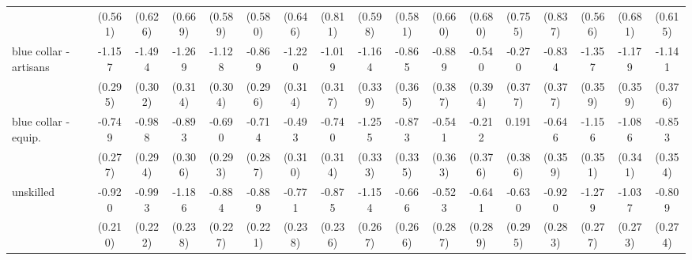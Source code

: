 {\begin{tabular}{l*{16}{c}}
                    &     (0.561)         &     (0.626)         &     (0.669)         &     (0.589)         &     (0.580)         &     (0.646)         &     (0.811)         &     (0.598)         &     (0.581)         &     (0.660)         &     (0.680)         &     (0.755)         &     (0.837)         &     (0.566)         &     (0.681)         &     (0.615)         \\
[1em]
blue collar - artisans&      -1.157\sym{***}&      -1.494\sym{***}&      -1.269\sym{***}&      -1.128\sym{***}&      -0.869\sym{**} &      -1.220\sym{***}&      -1.019\sym{**} &      -1.164\sym{***}&      -0.865\sym{*}  &      -0.889\sym{*}  &      -0.540         &      -0.270         &      -0.834\sym{*}  &      -1.357\sym{***}&      -1.179\sym{**} &      -1.141\sym{**} \\
                    &     (0.295)         &     (0.302)         &     (0.314)         &     (0.304)         &     (0.296)         &     (0.314)         &     (0.317)         &     (0.339)         &     (0.365)         &     (0.387)         &     (0.394)         &     (0.377)         &     (0.377)         &     (0.359)         &     (0.359)         &     (0.376)         \\
[1em]
blue collar - equip.&      -0.749\sym{**} &      -0.988\sym{***}&      -0.893\sym{**} &      -0.690\sym{*}  &      -0.714\sym{*}  &      -0.493         &      -0.740\sym{*}  &      -1.255\sym{***}&      -0.873\sym{**} &      -0.541         &      -0.212         &       0.191         &      -0.646         &      -1.156\sym{***}&      -1.086\sym{**} &      -0.853\sym{*}  \\
                    &     (0.277)         &     (0.294)         &     (0.306)         &     (0.293)         &     (0.287)         &     (0.310)         &     (0.314)         &     (0.333)         &     (0.335)         &     (0.363)         &     (0.376)         &     (0.386)         &     (0.359)         &     (0.351)         &     (0.341)         &     (0.354)         \\
[1em]
unskilled           &      -0.920\sym{***}&      -0.993\sym{***}&      -1.186\sym{***}&      -0.884\sym{***}&      -0.889\sym{***}&      -0.771\sym{**} &      -0.875\sym{***}&      -1.154\sym{***}&      -0.666\sym{*}  &      -0.523         &      -0.641\sym{*}  &      -0.630\sym{*}  &      -0.920\sym{**} &      -1.279\sym{***}&      -1.037\sym{***}&      -0.809\sym{**} \\
                    &     (0.210)         &     (0.222)         &     (0.238)         &     (0.227)         &     (0.221)         &     (0.238)         &     (0.236)         &     (0.267)         &     (0.266)         &     (0.287)         &     (0.289)         &     (0.295)         &     (0.283)         &     (0.277)         &     (0.273)         &     (0.274)         \\

\end{tabular}}
